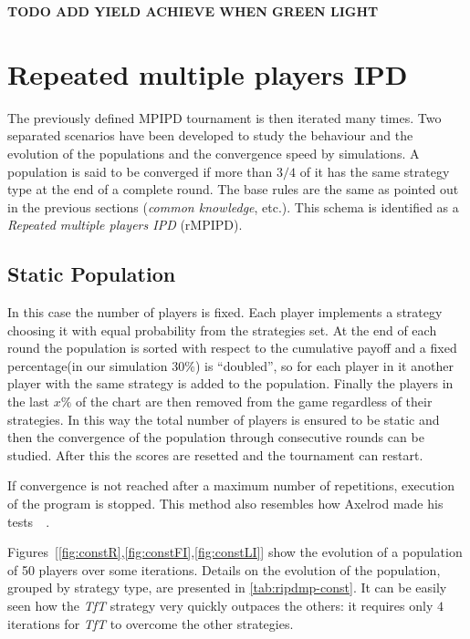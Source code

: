 \documentclass[journal,a4paper,10pt,twoside]{IEEEtran} %
\begin{document}
\textbf{TODO ADD YIELD ACHIEVE WHEN GREEN LIGHT}

\section{Repeated multiple players IPD} \label{s:rIPDMP}
The previously defined MPIPD tournament is then iterated many times.
Two separated scenarios have been developed to study the behaviour and the evolution of the populations and the convergence speed by simulations. A population is said to be converged if more than $3/4$ of it has the same strategy type at the end of a complete round. The base rules are the same as pointed out in the previous sections (\textit{common knowledge},  etc.).
This schema is identified as a \textit{Repeated multiple players IPD} (rMPIPD).

\subsection{Static Population}
In this case the number of players is fixed. Each player implements a strategy choosing it with equal probability from the strategies set. At the end of each round the population is sorted with respect to the cumulative payoff and a fixed percentage(in our simulation $30\%$) is ``doubled'', so for each player in it another player with the same strategy is added to the population. Finally the players in the last $x\%$ of the chart are then removed from the game regardless of their strategies. In this way the total number of players is ensured to be static and then the convergence of the population through consecutive rounds can be studied. After this the scores are resetted and the tournament can restart.

If convergence is not reached after a maximum number of repetitions, execution of the program is stopped.
This method also resembles how Axelrod made his tests~\cite[\S 2.6]{mathieu2017}~\cite{axelrod1984evolution}.

Figures~[\ref{fig:constR},\ref{fig:constFI},\ref{fig:constLI}] show the evolution of a population of 50 players over some iterations.
Details on the evolution of the population, grouped by strategy type, are presented in \autoref{tab:ripdmp-const}.
It can be easily seen how the \textit{TfT} strategy very quickly outpaces the others: it requires only $4$ iterations for \textit{TfT} to overcome the other strategies.
\end{document}
